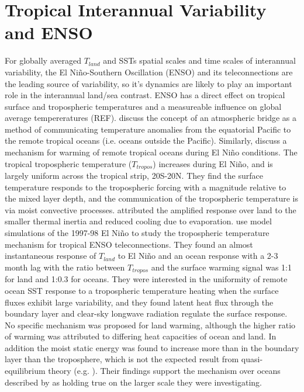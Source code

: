 \section{Tropical Interannual Variability and ENSO}

For globally averaged $T_{land}$ and SSTs spatial scales and time scales of 
interannual variability, the El Ni{\~n}o-Southern Oscillation (ENSO) and its 
teleconnections are the leading source of variability, so it's dynamics are 
likely to play an important role in the interannual land/sea contrast.  ENSO has 
a direct effect on tropical surface and tropospheric temperatures and a 
measureable influence on global average tempereratures (REF). \citet{Klein1999} 
discuss the concept of an atmospheric bridge as a method of communicating 
temperature anomalies from the equatorial Pacific to the remote tropical oceans 
(i.e. oceans outside the Pacific).  Similarly, \citet{Chiang2002} discuss a 
mechanism for warming of remote tropical oceans during El Ni{\~n}o conditions.  
The tropical tropospheric temperature ($T_{tropos}$) increases during El 
Ni{\~n}o, and is largely uniform across the tropical strip, 20S-20N. They find 
the surface temperature responds to the tropospheric forcing with a magnitude 
relative to the mixed layer depth, and the communication of the tropospheric 
temperature is via moist convective processes. \citet{Chiang2002} attributed the 
amplified response over land to the smaller thermal inertia and reduced cooling 
due to evaporation.  \citet{Chiang2005} use model simulations of the 1997-98 El 
Ni{\~n}o to study the tropospheric temperature mechanism for tropical ENSO 
teleconnections.  They found an almost instantaneous response of $T_{land}$ to  
El Ni{\~n}o and an ocean response with a 2-3 month lag with the ratio between 
$T_{tropos}$ and the surface warming signal was 1:1 for land and 1:0.3 for 
oceans. They were interested in the uniformity of remote ocean SST response to a 
tropospheric temperature heating when the surface fluxes exhibit large 
variability, and they found latent heat flux through the boundary layer and 
clear-sky longwave radiation regulate the surface response. No specific 
mechanism was proposed for land warming, although the higher ratio of warming 
was attributed to differing heat capacities of ocean and land. In addition the 
moist static energy was found to increase more than in the boundary layer than 
the troposphere, which is not the expected result from quasi-equilibrium theory 
(e.g. \citet{Brown1997}).  Their findings support the mechanism over oceans 
described by \citet{Chiang2002} as holding true on the larger scale they were 
investigating. 

